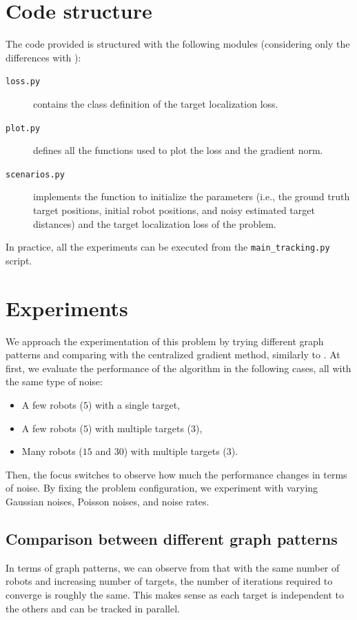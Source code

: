 \documentclass[a4paper,11pt,oneside]{book}
\begin{document}
\section{Code structure}
The code provided is structured with the following modules (considering only the differences with ):
\begin{description}
      \item[\texttt{loss.py}] contains the class definition of the target localization loss.
      \item[\texttt{plot.py}] defines all the functions used to plot the loss and the gradient norm.
      \item[\texttt{scenarios.py}] implements the function to initialize the parameters (i.e., the ground truth target positions, initial robot positions, and noisy estimated target distances) and the target localization loss of the problem.
\end{description}
In practice, all the experiments can be executed from the \texttt{main\_tracking.py} script.

\section{Experiments}

We approach the experimentation of this problem by trying different graph patterns and comparing with the centralized gradient method, similarly to . At first, we evaluate the performance of the algorithm in the following cases, all with the same type of noise:
\begin{itemize}
      \item A few robots ($5$) with a single target,
      \item A few robots ($5$) with multiple targets ($3$),
      \item Many robots ($15$ and $30$) with multiple targets ($3$).
\end{itemize}

Then, the focus switches to observe how much the performance changes in terms of noise. By fixing the problem configuration, we experiment with varying Gaussian noises, Poisson noises, and noise rates.


\subsection{Comparison between different graph patterns}

In terms of graph patterns, we can observe from  that with the same number of robots and increasing number of targets, the number of iterations required to converge is roughly the same. This makes sense as each target is independent to the others and can be tracked in parallel.
\end{document}

